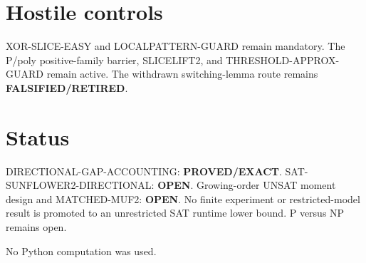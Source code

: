 \documentclass{article}
\begin{document}
\section*{Hostile controls}
XOR-SLICE-EASY and LOCALPATTERN-GUARD remain mandatory. The P/poly
positive-family barrier, SLICELIFT2, and THRESHOLD-APPROX-GUARD remain
active. The withdrawn switching-lemma route remains
\textbf{FALSIFIED/RETIRED}.

\section*{Status}
DIRECTIONAL-GAP-ACCOUNTING: \textbf{PROVED/EXACT}.
SAT-SUNFLOWER2-DIRECTIONAL: \textbf{OPEN}.
Growing-order UNSAT moment design and MATCHED-MUF2: \textbf{OPEN}.
No finite experiment or restricted-model result is promoted to an
unrestricted SAT runtime lower bound. P versus NP remains open.

No Python computation was used.
\end{document}
